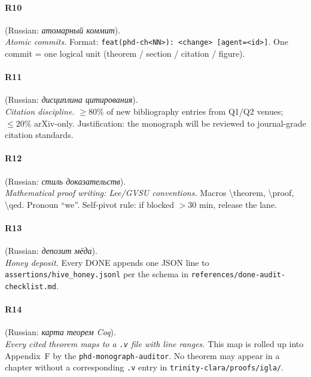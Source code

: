 \paragraph*{\textmd{\textbf{R10}}}
\label{entry:r10}
(Russian: \textit{атомарный коммит}).\\
\emph{Atomic commits.}
Format: \texttt{feat(phd-ch<NN>): <change> [agent=<id>]}.
One commit = one logical unit (theorem / section / citation / figure).

\paragraph*{\textmd{\textbf{R11}}}
\label{entry:r11}
(Russian: \textit{дисциплина цитирования}).\\
\emph{Citation discipline.}
$\ge 80\%$ of new bibliography entries from Q1/Q2 venues;
$\le 20\%$ arXiv-only.
Justification: the monograph will be reviewed to journal-grade
citation standards.

\paragraph*{\textmd{\textbf{R12}}}
\label{entry:r12}
(Russian: \textit{стиль доказательств}).\\
\emph{Mathematical proof writing: Lee/GVSU conventions.}
Macros \textbackslash theorem, \textbackslash proof, \textbackslash qed.
Pronoun ``we''.
Self-pivot rule: if blocked $> 30$ min, release the lane.

\paragraph*{\textmd{\textbf{R13}}}
\label{entry:r13}
(Russian: \textit{депозит мёда}).\\
\emph{Honey deposit.}
Every DONE appends one JSON line to
\texttt{assertions/hive\_honey.jsonl} per the schema in
\texttt{references/done-audit-checklist.md}.

\paragraph*{\textmd{\textbf{R14}}}
\label{entry:r14}
(Russian: \textit{карта теорем Coq}).\\
\emph{Every cited theorem maps to a \texttt{.v} file with line ranges.}
This map is rolled up into Appendix~F by the
\texttt{phd-monograph-auditor}.
No theorem may appear in a chapter without a corresponding
\texttt{.v} entry in \texttt{trinity-clara/proofs/igla/}.

